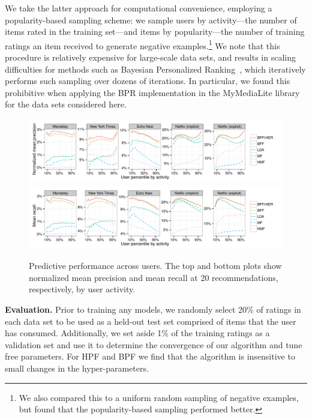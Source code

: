 We take the latter approach for computational convenience, employing a
popularity-based sampling scheme: we sample users by activity---the
number of items rated in the training set---and items by
popularity---the number of training ratings an item received to
generate negative examples.\footnote{We also compared this to a
  uniform random sampling of negative examples, but found that the
  popularity-based sampling performed better.} We note that this
procedure is relatively expensive for large-scale data sets, and
results in scaling difficulties for methods such as Bayesian
Personalized Ranking~\cite{Rendle:2009p9243,Gantner:2012p9364}, which
iteratively performs such sampling over dozens of iterations. In
particular, we found this prohibitive when applying the BPR
implementation in the MyMediaLite library for the data sets considered
here.


\begin{figure}[t!]
\centering
\includegraphics[width=\textwidth]{figures/mean_precision_at_20_by_user_percentile.pdf}\\
\includegraphics[width=\textwidth]{figures/mean_recall_at_20_by_user_percentile.pdf}\\
\caption{Predictive performance across users. The top and bottom plots
  show normalized mean precision and mean recall at 20
  recommendations, respectively, by user activity.}
\label{fig:precision_recall_by_user_activity}
\end{figure}

{\bf Evaluation.} Prior to training any models, we randomly select
20\% of ratings in each data set to be used as a held-out test set
comprised of items that the user has consumed. Additionally, we set
aside 1\% of the training ratings as a validation set and use it to
determine the convergence of our algorithm and tune free parameters.
For HPF and BPF we find that the algorithm is insensitive to small
changes in the hyper-parameters.

